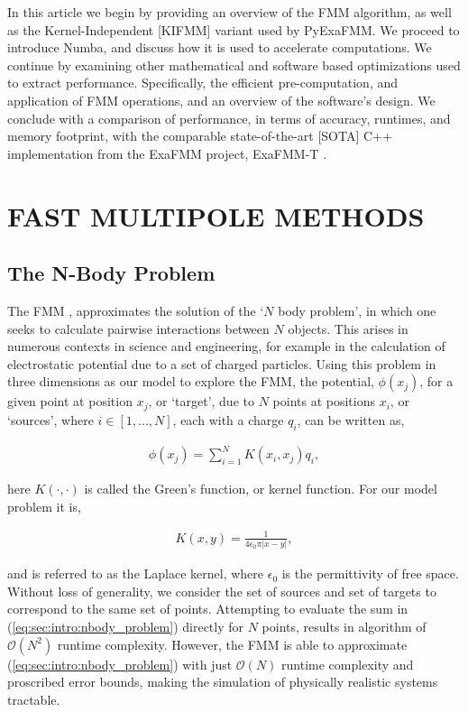 \documentclass{IEEEcsmag}
\begin{document}
In this article we begin by providing an overview of the FMM algorithm, as well as the Kernel-Independent [KIFMM] variant
\cite{Ying2004} used by PyExaFMM. We proceed to introduce Numba, and discuss how it is used to accelerate computations. We continue by examining other mathematical and software based optimizations used to extract performance. Specifically, the efficient pre-computation, and application of FMM operations, and an overview of the software's design. We conclude with a comparison of performance, in terms of accuracy, runtimes, and memory footprint, with the comparable state-of-the-art [SOTA] C++ implementation from the ExaFMM project, ExaFMM-T \cite{Wang2021}.

\section{FAST MULTIPOLE METHODS}

\subsection{The N-Body Problem}

The FMM \cite{Greengard1987}, approximates the solution of the `$N$ body problem', in which one seeks to calculate pairwise interactions between $N$ objects. This arises in numerous contexts in science and engineering, for example in the calculation of electrostatic potential due to a set of charged particles. Using this problem in three dimensions as our model to explore the FMM, the potential, $\phi(x_j)$, for a given point at position $x_j$, or `target', due to $N$ points at positions $x_i$, or `sources', where $i \in [1, ..., N]$, each with a charge $q_i$, can be written as,

\begin{eqnarray}
	\phi(x_j) = \sum_{i=1}^{N} K(x_i, x_j) q_i,
\label{eq:sec:intro:nbody_problem}
\end{eqnarray}

here $K(\cdot, \cdot)$ is called the Green's function, or kernel function. For our model problem it is,

\begin{eqnarray}
	K(x, y) = \frac{1}{4\epsilon_0\pi|x-y|},
\label{eq:sec:intro:laplace_kernel}
\end{eqnarray}

and is referred to as the Laplace kernel, where $\epsilon_0$ is the permittivity of free space. Without loss of generality, we consider the set of sources and set of targets to correspond to the same set of points. Attempting to evaluate the sum in (\ref{eq:sec:intro:nbody_problem}) directly for $N$ points, results in algorithm of $\mathcal{O}(N^2)$ runtime complexity. However, the FMM is able to approximate (\ref{eq:sec:intro:nbody_problem}) with just $\mathcal{O}(N)$ runtime complexity and proscribed error bounds, making the simulation of physically realistic systems tractable.
\end{document}

